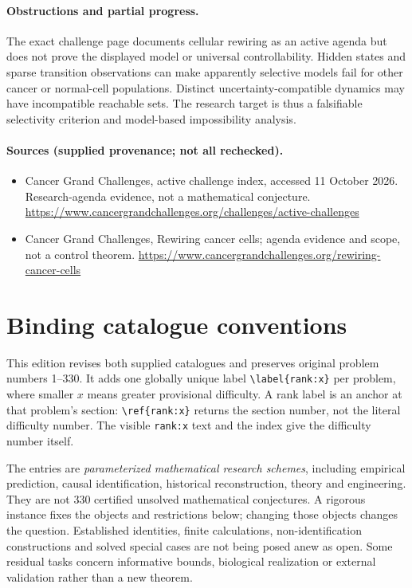 \documentclass[11pt]{article}
\begin{document}
\paragraph{Obstructions and partial progress.} The exact challenge page documents cellular rewiring as an active agenda but does not prove the displayed model or universal controllability. Hidden states and sparse transition observations can make apparently selective models fail for other cancer or normal-cell populations. Distinct uncertainty-compatible dynamics may have incompatible reachable sets. The research target is thus a falsifiable selectivity criterion and model-based impossibility analysis.
\paragraph{Sources (supplied provenance; not all rechecked).}
\begin{itemize}
\item Cancer Grand Challenges, active challenge index, accessed 11 October 2026. Research-agenda evidence, not a mathematical conjecture. \url{https://www.cancergrandchallenges.org/challenges/active-challenges}
\item Cancer Grand Challenges, Rewiring cancer cells; agenda evidence and scope, not a control theorem. \url{https://www.cancergrandchallenges.org/rewiring-cancer-cells}
\end{itemize}


\section*{Binding catalogue conventions}
This edition revises both supplied catalogues and preserves original problem numbers 1--330. It adds one globally unique label \verb|\label{rank:x}| per problem, where smaller $x$ means greater provisional difficulty. A rank label is an anchor at that problem's section: \verb|\ref{rank:x}| returns the section number, not the literal difficulty number. The visible \texttt{rank:x} text and the index give the difficulty number itself.

The entries are \emph{parameterized mathematical research schemes}, including empirical prediction, causal identification, historical reconstruction, theory and engineering. They are not 330 certified unsolved mathematical conjectures. A rigorous instance fixes the objects and restrictions below; changing those objects changes the question. Established identities, finite calculations, non-identification constructions and solved special cases are not being posed anew as open. Some residual tasks concern informative bounds, biological realization or external validation rather than a new theorem.
\end{document}
